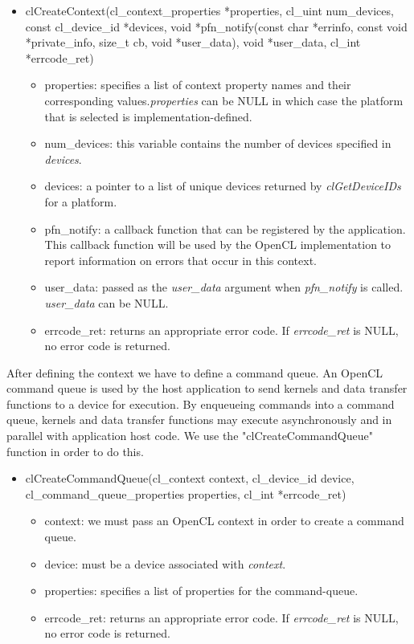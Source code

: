 \documentclass[titlepage]{article}
\begin{document}
\begin{itemize}
    \item clCreateContext(cl\_context\_properties *properties, cl\_uint num\_devices, const cl\_device\_id *devices, void *pfn\_notify(const char *errinfo, const void *private\_info, size\_t cb, void *user\_data), void *user\_data, cl\_int *errcode\_ret)
    \begin{itemize}
        \item properties: specifies a list of context property names and their corresponding values.\textit{properties} can be NULL in which case the platform that is selected is implementation-defined.
        \item num\_devices: this variable contains the number of devices specified in \textit{devices}.
        \item devices: a pointer to a list of unique devices returned by \textit{clGetDeviceIDs} for a platform.
        \item pfn\_notify: a callback function that can be registered by the application. This callback function will be used by the OpenCL implementation to report information on errors that occur in this context.
        \item user\_data: passed as the \textit{user\_data} argument when \textit{pfn\_notify} is called. \textit{user\_data} can be NULL.
        \item errcode\_ret: returns an appropriate error code. If \textit{errcode\_ret} is NULL, no error code is returned. 
    \end{itemize}
\end{itemize}

After defining the context we have to define a command queue. An OpenCL command queue is used by the host application to send kernels and data transfer functions to a device for execution. By enqueueing commands into a command queue, kernels and data transfer functions may execute asynchronously and in parallel with application host code. We use the "clCreateCommandQueue" function in order to do this.

\begin{itemize}
    \item clCreateCommandQueue(cl\_context context, cl\_device\_id device, \newline cl\_command\_queue\_properties properties, cl\_int *errcode\_ret)
    \begin{itemize}
        \item context: we must pass an OpenCL context in order to create a command queue.
        \item device: must be a device associated with \textit{context}.
        \item properties: specifies a list of properties for the command-queue.
        \item errcode\_ret: returns an appropriate error code. If \textit{errcode\_ret} is NULL, no error code is returned. 
    \end{itemize}
\end{itemize}
\end{document}
